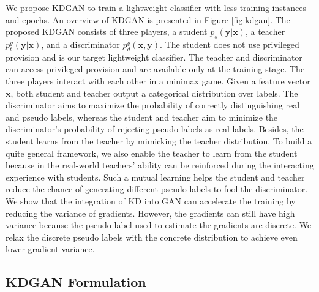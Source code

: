 \documentclass{article}
\newcommand{\OVEC}[1]{\bm{#1}} %
\newcommand{\fullpstd}[1]{p_{s}(#1|\OVEC{x})}
\newcommand{\fullptch}[1]{p_{t}^{\varrho}(#1|\OVEC{x})}
\newcommand{\fullpdis}[1]{p_{d}^{\varrho}(\OVEC{x},#1)}
\begin{document}
We propose KDGAN to train a lightweight classifier with less training instances and epochs.
An overview of KDGAN is presented in Figure \ref{fig:kdgan}.
The proposed KDGAN consists of three players, a student $\fullpstd{\OVEC{y}}$, a teacher $\fullptch{\OVEC{y}}$, and a discriminator $\fullpdis{\OVEC{y}}$.
The student does not use privileged provision and is our target lightweight classifier.
The teacher and discriminator can access privileged provision and are available only at the training stage.
The three players interact with each other in a minimax game.
Given a feature vector $\OVEC{x}$, both student and teacher output a categorical 
distribution over labels.
The discriminator aims to maximize the probability of correctly distinguishing real and pseudo labels, whereas the student and teacher aim to minimize the discriminator's probability of rejecting pseudo labels as real labels.
Besides, the student learns from the teacher by mimicking the teacher distribution.
To build a quite general framework, we also enable the teacher to learn from the student because in the real-world teachers' ability can be reinforced during the interacting experience with students.
Such a mutual learning helps the student and teacher reduce the chance of generating different pseudo labels to fool the discriminator.
We show that the integration of KD into GAN can accelerate the training by reducing the variance of gradients.
However, the gradients can still have high variance because the pseudo label used to estimate the gradients are discrete.
We relax the discrete pseudo labels with the concrete distribution \cite{jang2016categorical,maddison2016concrete} to achieve even lower gradient variance.

\subsection{KDGAN Formulation} \label{sec:kdgan formulation}
\end{document}
